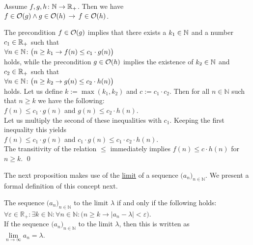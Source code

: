 \begin{Proposition} 
Assume $f,g,h \colon {\mathbb N} \rightarrow {{\mathbb R}_+}$. Then we have \\[0.2cm]
\hspace*{1.3cm}
 $f \in \mathcal{O}(g) \wedge g \in \mathcal{O}(h) \,\rightarrow\, f \in \mathcal{O}(h)$.

\end{Proposition}

\proof
The precondition $f \in \mathcal{O}(g)$ implies that there exists a $k_1 \in {\mathbb N}$ and a number $c_1 \in {\mathbb R}_+$
such that 
\\[0.2cm]
\hspace*{1.3cm} 
$\forall n \in {\mathbb N} \colon\bigl( n \geq k_1 \rightarrow f(n) \leq c_1 \cdot g(n)\bigr)$ 
\\[0.2cm]
holds, while the precondition $g \in \mathcal{O}(h)$ implies the existence of $k_2 \in {\mathbb N}$ and $c_2 \in {\mathbb R}_+$
such that \\[0.2cm]
\hspace*{1.3cm} 
$\forall n \in {\mathbb N} \colon\bigl( n \geq k_2 \rightarrow g(n) \leq c_2 \cdot h(n)\bigr)$ 
\\[0.2cm]
holds.  Let us define $k:= \max(k_1,k_2)$ and $c := c_1 \cdot c_2$.  Then for all $n \in \mathbb{N}$
such that $n \geq k$ we have the following:
\\[0.2cm]
\hspace*{1.3cm}
$f(n) \leq c_1\cdot g(n)$ \quad and \quad $g(n) \leq c_2 \cdot h(n)$. 
\\[0.2cm]
Let us multiply the second of these inequalities with $c_1$.  Keeping the first inequality this yields
\\[0.2cm]
\hspace*{1.3cm}
$f(n) \leq c_1\cdot g(n)$  \quad and \quad $c_1\cdot g(n) \leq c_1\cdot c_2 \cdot h(n)$. 
\\[0.2cm]
The transitivity of the relation $\leq$ immediately implies $f(n) \leq c \cdot h(n)$ for $n \geq k$.  
\qed

\noindent
The next proposition makes use of the \href{https://en.wikipedia.org/wiki/Limit_of_a_sequence}{limit} of a sequence
$\bigl(a_n\bigr)_{n\in\mathbb{N}}$.  We present a formal definition of this concept next. 

\begin{Definition} 
  The sequence $\bigl(a_n\bigr)_{n\in\mathbb{N}}$   to the limit $\lambda$ if and only if
  the following holds:
  \\[0.2cm]
  \hspace*{1.3cm}
  $\forall \varepsilon\in\mathbb{R}_+: \exists k\in\mathbb{N}:\forall n\in\mathbb{N}:
   \bigl(n \geq k \rightarrow \bigl|a_n - \lambda\bigr| < \varepsilon\bigr)$.
  \\[0.2cm]
  If the sequence $\bigl(a_n\bigr)_{n\in\mathbb{N}}$  to the limit $\lambda$, then this is
  written as
  \\[0.2cm]
  \hspace*{1.3cm}
  $\lim\limits_{n\rightarrow\infty} a_n = \lambda$.  \eox
\end{Definition}


